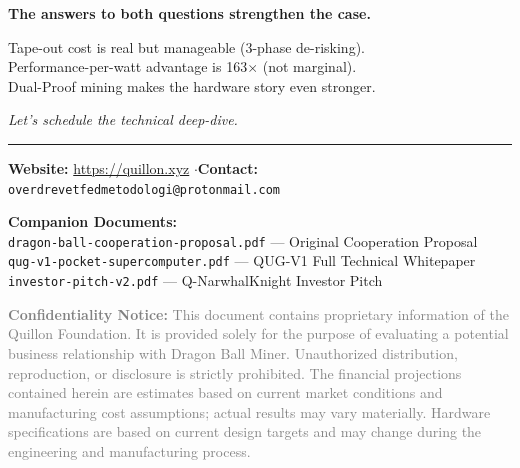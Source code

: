 \documentclass[11pt,a4paper]{article}
\begin{document}
\begin{center}
\begin{tcolorbox}[
    enhanced, colback=qnkpurple!8, colframe=qnkpurple,
    boxrule=1.5pt, arc=8pt, width=14cm,
    shadow={2mm}{-2mm}{0mm}{black!20}
]
\begin{center}
{\Large\bfseries\textcolor{qnkpurple}{The answers to both questions strengthen the case.}}

\vspace{0.4cm}

{\large\textcolor{qnkslate}{Tape-out cost is real but manageable (3-phase de-risking).\\
Performance-per-watt advantage is 163$\times$ (not marginal).\\
Dual-Proof mining makes the hardware story even stronger.}}

\vspace{0.4cm}

{\textcolor{qnkslate}{\textit{Let's schedule the technical deep-dive.}}}
\end{center}
\end{tcolorbox}
\end{center}


\vfill

\begin{center}
\textcolor{qnkslate}{\rule{8cm}{0.5pt}}

\vspace{0.3cm}

{\small
\textbf{Website:} \url{https://quillon.xyz} \quad$\cdot$\quad \textbf{Contact:} \texttt{overdrevetfedmetodologi@protonmail.com}

\vspace{0.2cm}

\textbf{Companion Documents:}\\
\texttt{dragon-ball-cooperation-proposal.pdf} --- Original Cooperation Proposal\\
\texttt{qug-v1-pocket-supercomputer.pdf} --- QUG-V1 Full Technical Whitepaper\\
\texttt{investor-pitch-v2.pdf} --- Q-NarwhalKnight Investor Pitch
}
\end{center}

\vspace{0.5cm}

\begin{center}
\begin{minipage}{13cm}
{\scriptsize\textcolor{gray}{
\textbf{Confidentiality Notice:} This document contains proprietary information of the Quillon Foundation. It is provided solely for the purpose of evaluating a potential business relationship with Dragon Ball Miner. Unauthorized distribution, reproduction, or disclosure is strictly prohibited. The financial projections contained herein are estimates based on current market conditions and manufacturing cost assumptions; actual results may vary materially. Hardware specifications are based on current design targets and may change during the engineering and manufacturing process.
}}
\end{minipage}
\end{center}
\end{document}

